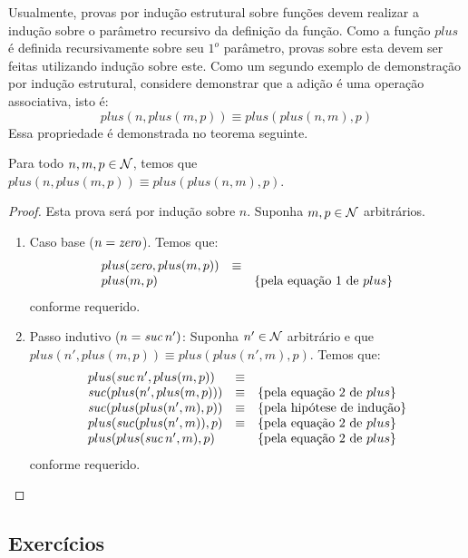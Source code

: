 Usualmente, provas por indução estrutural sobre funções devem realizar
a indução sobre o parâmetro recursivo da definição da função. Como a
função $plus$ é definida recursivamente sobre seu $1^o$ parâmetro,
provas sobre esta devem ser feitas utilizando indução sobre este.
Como um segundo exemplo de demonstração por indução estrutural,
considere demonstrar que a adição é uma operação associativa, isto é:
\[
plus(n, plus(m,p)) \equiv plus (plus(n,m),p)
\]
Essa propriedade é demonstrada no teorema seguinte.
\begin{Theorem}
Para todo $n,m,p\in\mathcal{N}$, temos que $plus(n, plus(m,p)) \equiv plus
(plus(n,m),p)$.
\end{Theorem}
\begin{proof}
Esta prova será por indução sobre $n$. Suponha $m,p\in\mathcal{N}$ arbitrários.
\begin{enumerate}
  \item Caso base ($n = \textit{zero\/}$). Temos que:
  \[
\begin{array}{lcl}
plus(\textit{zero\/},plus(m,p)) & \equiv & \\
plus(m,p) & & \{\text{pela equação 1 de }plus\}
\end{array}
\]
conforme requerido.
\item Passo indutivo ($n = \textit{suc\/}\, n')$: Suponha $n'\in\mathcal{N}$ arbitrário
  e que $plus(n', plus(m,p)) \equiv plus (plus(n',m),p)$. Temos que:
\[
\begin{array}{lcl}
plus(\textit{suc\/}\,n', plus(m,p)) & \equiv & \\
\textit{suc\/}(plus(n',plus(m,p))) & \equiv & \{\text{pela equação 2 de }plus\}\\
\textit{suc\/}(plus(plus(n',m),p)) & \equiv & \{\text{pela hipótese de
  indução}\}\\
plus(\textit{suc\/}(plus(n',m)),p) & \equiv & \{\text{pela equação 2 de
}plus\}\\
plus(plus(\textit{suc\/}\,n',m),p) & &\{\text{pela equação 2 de }plus\}\\
\end{array}
\]
conforme requerido.
\end{enumerate}
\end{proof}

\subsection{Exercícios}

